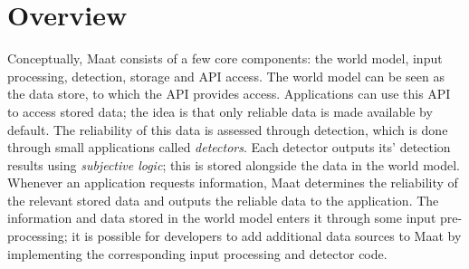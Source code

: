 \chapter{Overview}

Conceptually, Maat consists of a few core components: the world model, input processing, detection, storage and API access. The world model can be seen as the data store, to which the API provides access. Applications can use this API to access stored data; the idea is that only reliable data is made available by default. The reliability of this data is assessed through detection, which is done through small applications called \emph{detectors}. Each detector outputs its' detection results using \emph{subjective logic}; this is stored alongside the data in the world model. Whenever an application requests information, Maat determines the reliability of the relevant stored data and outputs the reliable data to the application. The information and data stored in the world model enters it through some input pre-processing; it is possible for developers to add additional data sources to Maat by implementing the corresponding input processing and detector code.
